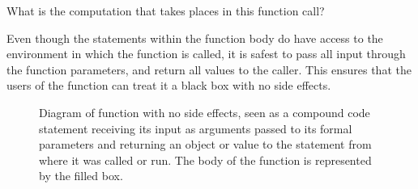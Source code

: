 \documentclass[krantz2]{krantz}\usepackage{knitr}
\begin{document}
\begin{playground}
What is the computation that takes places in this function call?

\begin{knitrout}\footnotesize
{}\color{fgcolor}\begin{kframe}
\begin{alltt}
\hlstd{(} \hlstd{=} \hlstd{,}  \hlstd{=} \hlstd{)}
\end{alltt}
\end{kframe}
\end{knitrout}
\end{playground}

\begin{warningbox}
Even though the statements within the function body do have access to the environment in which the function is called, it is safest to pass all input through the function parameters, and return all values to the caller. This ensures that the users of the function can treat it a black box with no side effects.
\end{warningbox}

\begin{figure}
  \centering
\begin{small}
\end{small}
  \caption[Diagram of function with no side effects]{Diagram of function with no side effects, seen as a compound code statement receiving its input as arguments passed to its formal parameters and returning an object or value to the statement from where it was called or run. The body of the function is represented by the filled box.}\label{fig:function:diagram}
\end{figure}
\end{document}
